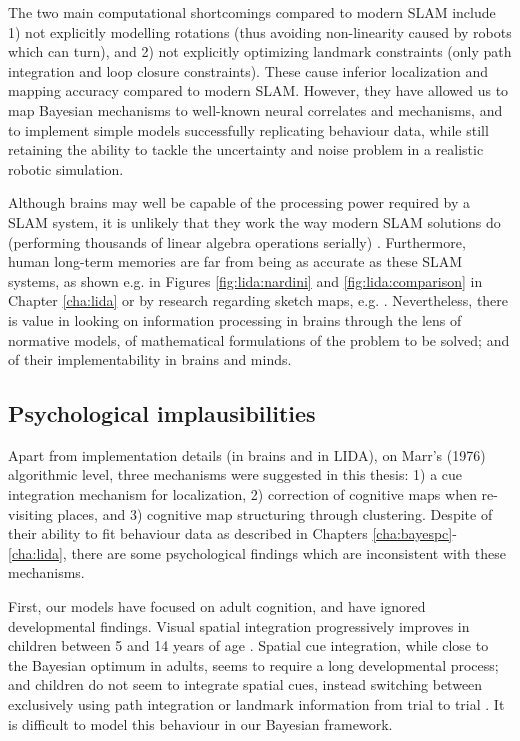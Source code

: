 The two main computational shortcomings compared to modern SLAM include 1) not explicitly modelling rotations (thus avoiding non-linearity caused by robots which can turn), and 2) not explicitly optimizing landmark constraints (only path integration and loop closure constraints). These cause inferior localization and mapping accuracy compared to modern SLAM. However, they have allowed us to map Bayesian mechanisms to well-known neural correlates and mechanisms, and to implement simple models successfully replicating behaviour data, while still retaining the ability to tackle the uncertainty and noise problem in a realistic robotic simulation.

Although brains may well be capable of the processing power required by a SLAM system, it is unlikely that they work the way modern SLAM solutions do (performing thousands of linear algebra operations serially) \citep{thrun2008simultaneous}. Furthermore, human long-term memories are far from being as accurate as these SLAM systems, as shown e.g. in Figures \ref{fig:lida:nardini} and \ref{fig:lida:comparison} in Chapter \ref{cha:lida} or by research regarding sketch maps, e.g. \citep{rovine1989sketch, wang2009accuracy}. Nevertheless, there is value in looking on information processing in brains through the lens of normative models, of mathematical formulations of the problem to be solved; and of their implementability in brains and minds. 

\subsection{Psychological implausibilities}

Apart from implementation details (in brains and in LIDA), on Marr's (1976) algorithmic level, three mechanisms were suggested in this thesis: 1) a cue integration mechanism for localization, 2) correction of cognitive maps when re-visiting places, and 3) cognitive map structuring through clustering. Despite of their ability to fit behaviour data as described in Chapters \ref{cha:bayespc}-\ref{cha:lida}, there are some psychological findings which are inconsistent with these mechanisms. 

First, our models have focused on adult cognition, and have ignored developmental findings. Visual spatial integration progressively improves in children between 5 and 14 years of age \citep{kovacs1999late}. Spatial cue integration, while close to the Bayesian optimum in adults, seems to require a long developmental process; and children do not seem to integrate spatial cues, instead switching between exclusively using path integration or landmark information from trial to trial \citep{nardini2008development}. It is difficult to model this behaviour in our Bayesian framework.

